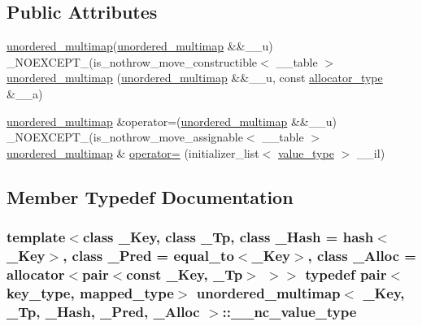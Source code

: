 \subsection*{Public Attributes}
\begin{DoxyCompactItemize}
\item 
\hyperlink{classunordered__multimap}{unordered\+\_\+multimap}(\hyperlink{classunordered__multimap}{unordered\+\_\+multimap} \&\&\+\_\+\+\_\+u) \+\_\+\+N\+O\+E\+X\+C\+E\+P\+T\+\_\+(is\+\_\+nothrow\+\_\+move\+\_\+constructible$<$ \+\_\+\+\_\+table $>$ \hyperlink{classunordered__multimap_adbbf07ec1c79d182c91c7925502cd69b}{unordered\+\_\+multimap} (\hyperlink{classunordered__multimap}{unordered\+\_\+multimap} \&\&\+\_\+\+\_\+u, const \hyperlink{classunordered__multimap_a821ff3be687cecd9ef325efa93759c19}{allocator\+\_\+type} \&\+\_\+\+\_\+a)
\item 
\hyperlink{classunordered__multimap}{unordered\+\_\+multimap} \&operator=(\hyperlink{classunordered__multimap}{unordered\+\_\+multimap} \&\&\+\_\+\+\_\+u) \+\_\+\+N\+O\+E\+X\+C\+E\+P\+T\+\_\+(is\+\_\+nothrow\+\_\+move\+\_\+assignable$<$ \+\_\+\+\_\+table $>$ \hyperlink{classunordered__multimap}{unordered\+\_\+multimap} \& \hyperlink{classunordered__multimap_ad2926274cc9380feb875e99003f42a77}{operator=} (initializer\+\_\+list$<$ \hyperlink{classunordered__multimap_a106d390dc0deafc47f10d3943b247ee6}{value\+\_\+type} $>$ \+\_\+\+\_\+il)
\end{DoxyCompactItemize}


\subsection{Member Typedef Documentation}
\hypertarget{classunordered__multimap_a02f7a45f9e19d7a13e361aa3509af744}{}
\subsubsection[{\+\_\+\+\_\+nc\+\_\+value\+\_\+type}]{\setlength{\rightskip}{0pt plus 5cm}template$<$class \+\_\+\+Key, class \+\_\+\+Tp, class \+\_\+\+Hash = hash$<$\+\_\+\+Key$>$, class \+\_\+\+Pred = equal\+\_\+to$<$\+\_\+\+Key$>$, class \+\_\+\+Alloc = allocator$<$pair$<$const \+\_\+\+Key, \+\_\+\+Tp$>$ $>$$>$ typedef pair$<${\bf key\+\_\+type}, {\bf mapped\+\_\+type}$>$ {\bf unordered\+\_\+multimap}$<$ \+\_\+\+Key, \+\_\+\+Tp, \+\_\+\+Hash, \+\_\+\+Pred, \+\_\+\+Alloc $>$\+::{\bf \+\_\+\+\_\+nc\+\_\+value\+\_\+type}}\label{classunordered__multimap_a02f7a45f9e19d7a13e361aa3509af744}
\hypertarget{classunordered__multimap_a02f7a45f9e19d7a13e361aa3509af744}{}

